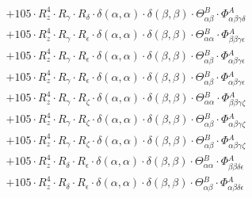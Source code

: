 \documentclass{article}
\begin{document}
\begin{subequations}
\begin{gather}
\begin{array}{c}
 \\[0.2em] 		 + 105 \cdot R_{z}^{4} \cdot R_{\gamma{}} \cdot R_{\delta{}} \cdot \delta{}\left(\alpha{}, \alpha{}\right) \cdot \delta{}\left(\beta{}, \beta{}\right) \cdot \Theta{}^{B}_{\alpha{}\beta{}} \cdot \Phi{}^{A}_{\alpha{}\beta{}\gamma{}\delta{}} 
 \\[0.2em] 		 + 105 \cdot R_{z}^{4} \cdot R_{\gamma{}} \cdot R_{\epsilon{}} \cdot \delta{}\left(\alpha{}, \alpha{}\right) \cdot \delta{}\left(\beta{}, \beta{}\right) \cdot \Theta{}^{B}_{\alpha{}\alpha{}} \cdot \Phi{}^{A}_{\beta{}\beta{}\gamma{}\epsilon{}} 
 \\[0.2em] 		 + 105 \cdot R_{z}^{4} \cdot R_{\gamma{}} \cdot R_{\epsilon{}} \cdot \delta{}\left(\alpha{}, \alpha{}\right) \cdot \delta{}\left(\beta{}, \beta{}\right) \cdot \Theta{}^{B}_{\alpha{}\beta{}} \cdot \Phi{}^{A}_{\alpha{}\beta{}\gamma{}\epsilon{}} 
 \\[0.2em] 		 + 105 \cdot R_{z}^{4} \cdot R_{\gamma{}} \cdot R_{\epsilon{}} \cdot \delta{}\left(\alpha{}, \alpha{}\right) \cdot \delta{}\left(\beta{}, \beta{}\right) \cdot \Theta{}^{B}_{\alpha{}\beta{}} \cdot \Phi{}^{A}_{\alpha{}\beta{}\gamma{}\epsilon{}} 
 \\[0.2em] 		 + 105 \cdot R_{z}^{4} \cdot R_{\gamma{}} \cdot R_{\zeta{}} \cdot \delta{}\left(\alpha{}, \alpha{}\right) \cdot \delta{}\left(\beta{}, \beta{}\right) \cdot \Theta{}^{B}_{\alpha{}\alpha{}} \cdot \Phi{}^{A}_{\beta{}\beta{}\gamma{}\zeta{}} 
 \\[0.2em] 		 + 105 \cdot R_{z}^{4} \cdot R_{\gamma{}} \cdot R_{\zeta{}} \cdot \delta{}\left(\alpha{}, \alpha{}\right) \cdot \delta{}\left(\beta{}, \beta{}\right) \cdot \Theta{}^{B}_{\alpha{}\beta{}} \cdot \Phi{}^{A}_{\alpha{}\beta{}\gamma{}\zeta{}} 
 \\[0.2em] 		 + 105 \cdot R_{z}^{4} \cdot R_{\gamma{}} \cdot R_{\zeta{}} \cdot \delta{}\left(\alpha{}, \alpha{}\right) \cdot \delta{}\left(\beta{}, \beta{}\right) \cdot \Theta{}^{B}_{\alpha{}\beta{}} \cdot \Phi{}^{A}_{\alpha{}\beta{}\gamma{}\zeta{}} 
 \\[0.2em] 		 + 105 \cdot R_{z}^{4} \cdot R_{\delta{}} \cdot R_{\epsilon{}} \cdot \delta{}\left(\alpha{}, \alpha{}\right) \cdot \delta{}\left(\beta{}, \beta{}\right) \cdot \Theta{}^{B}_{\alpha{}\alpha{}} \cdot \Phi{}^{A}_{\beta{}\beta{}\delta{}\epsilon{}} 
 \\[0.2em] 		 + 105 \cdot R_{z}^{4} \cdot R_{\delta{}} \cdot R_{\epsilon{}} \cdot \delta{}\left(\alpha{}, \alpha{}\right) \cdot \delta{}\left(\beta{}, \beta{}\right) \cdot \Theta{}^{B}_{\alpha{}\beta{}} \cdot \Phi{}^{A}_{\alpha{}\beta{}\delta{}\epsilon{}} 

\end{array}
\end{gather}
\end{subequations}
\end{document}
